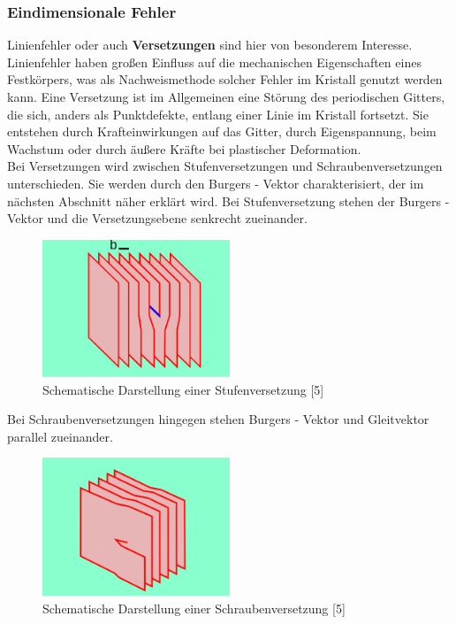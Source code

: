         \subsubsection*{Eindimensionale Fehler}
            Linienfehler oder auch \textbf{Versetzungen} sind hier von besonderem Interesse. Linienfehler haben 
            großen Einfluss auf die mechanischen Eigenschaften eines Festkörpers, was
            als Nachweismethode solcher Fehler im Kristall genutzt werden kann. Eine Versetzung ist im Allgemeinen eine Störung des periodischen Gitters, 
            die sich, anders als Punktdefekte, entlang einer Linie im Kristall fortsetzt. Sie entstehen durch Krafteinwirkungen auf das Gitter,
            durch Eigenspannung, beim Wachstum oder durch äußere Kräfte bei plastischer Deformation.\\
            Bei Versetzungen wird zwischen Stufenversetzungen und Schraubenversetzungen unterschieden.
            Sie werden durch den Burgers - Vektor charakterisiert, der im nächsten Abschnitt näher erklärt wird.
            Bei Stufenversetzung stehen der Burgers - Vektor und die Versetzungsebene senkrecht zueinander.
            \begin{figure}[H]
                \centering
                \includegraphics[width=0.5\textwidth]{Images/Stufenversetzung.png}
                \caption{Schematische Darstellung einer Stufenversetzung [5]}
            \end{figure}
            Bei Schraubenversetzungen hingegen stehen Burgers - Vektor und Gleitvektor parallel zueinander.
            \begin{figure}[H]
                \centering
                \includegraphics[width=0.5\textwidth]{Images/Schraubenversetzung.png}
                \caption{Schematische Darstellung einer Schraubenversetzung [5]}
            \end{figure}
